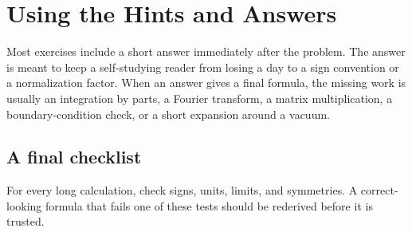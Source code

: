 \chapter{Using the Hints and Answers}

Most exercises include a short answer immediately after the problem.  The answer is meant to keep a self-studying reader from losing a day to a sign convention or a normalization factor.  When an answer gives a final formula, the missing work is usually an integration by parts, a Fourier transform, a matrix multiplication, a boundary-condition check, or a short expansion around a vacuum.

\section{A final checklist}

For every long calculation, check signs, units, limits, and symmetries.  A correct-looking formula that fails one of these tests should be rederived before it is trusted.
